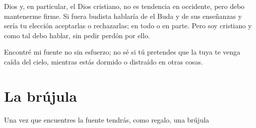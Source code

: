 Dios y, en particular, el Dios cristiano, no es tendencia en occidente, pero debo mantenerme firme. Si fuera budista hablaría de el Buda y de sus enseñanzas y sería tu elección aceptarlas o rechazarlas; en todo o en parte. Pero soy cristiano y como tal debo hablar, sin pedir perdón por ello.

Encontré mi fuente no sin esfuerzo; no sé si tú pretendes que la tuya te venga caída del cielo, mientras estás dormido o distraído en otras cosas.

\section{La brújula}

Una vez que encuentres la fuente tendrás, como regalo, una brújula

